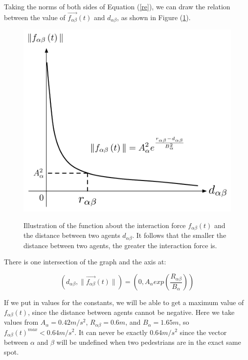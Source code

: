 Taking the norms of both sides of Equation (\ref{re}), we can draw the relation between the value of $\overrightarrow{f_{\alpha\beta}}(t)$ and $ d_{\alpha\beta} $, as shown in Figure 
(\ref{fig:physicalinteraction2}).\\

\begin{figure}[hb]
    \centering
    {\includegraphics[scale=0.45]{Figures/physicalinteraction.pdf}} 
    \caption[Psysical interaction]{Illustration of the function about the interaction force 
        $f_{\alpha\beta}(t)$ and the distance between two agents
        $d_{\alpha \beta}$. It follows that the smaller the distance between two agents, the greater the interaction force is. }
    \label{fig:physicalinteraction2}
\end{figure}

There is one intersection of the graph and the  axis at:

\begin{equation}
	\left( d_{\alpha \beta} , \| \overrightarrow{f_{\alpha \beta}} \left( t \right) \| \right)
 =
	\left( 0 , A_{\alpha} exp\left( \frac{R_{\alpha\beta} }{B_{\alpha}}\right)  \right) 
\end{equation}

If we put in values for the constants, we will be able to get a maximum value of $ f_{\alpha\beta}(t) $, 
since the distance between agents cannot be negative. Here we take values from \cite{ABconstant} $ A_{\alpha} = 0.42 m/s^{2} $, 
$ R_{\alpha\beta} = 0.6 m $, and $ B_{\alpha} = 1.65 m $, so 
$ f_{\alpha\beta}(t)^{max} < 0.64 m/s^{2} $. It can never be exactly $0.64m/s^2$ since the vector between $\alpha$ and $\beta$ will be undefined when two pedestrians are in the exact same spot.

